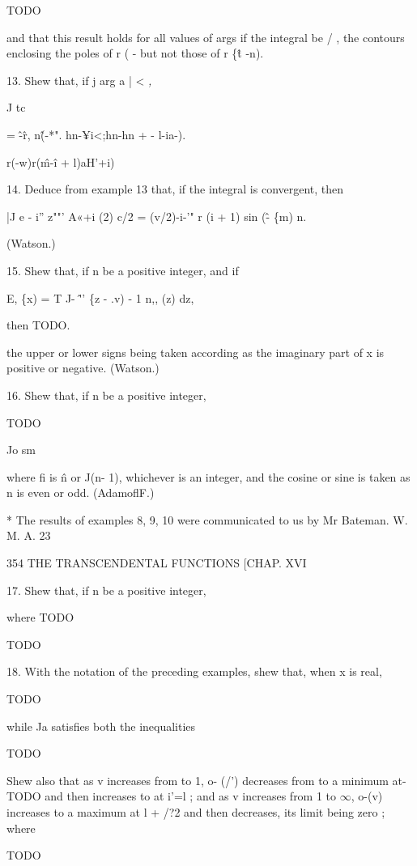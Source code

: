 TODO

and that this result holds for all values of args if the integral be / , the contours 
enclosing the poles of r ( - but not those of r \{\^t -n). 

13. Shew that, if j arg a | < \it, 

J tc 

= \^-\^ r, n\^(-*". hn-¥i<;hn-hn + - l-ia-). 

r(-w)r(\^m-\^i + l)aH'+i) 

14. Deduce from example 13 that, if the integral is convergent, then 

|J e - i'' z""' A«+i (2) c/2 = (v/2)-i-'" r (i + 1) sin (\^ - \{m) n. 

(Watson.) 

15. Shew that, if n be a positive integer, and if 

E, \{x) = T J- \^'' \{z - .v) - 1 n,, (z) dz, 

then TODO.

the upper or lower signs being taken according as the imaginary part of x is positive 
or negative. (Watson.) 

16. Shew that, if n be a positive integer, 

TODO

Jo sm 

where fi is \^n or J(n- 1), whichever is an integer, and the cosine or sine is taken as n is 
even or odd. (AdamoflF.) 

* The results of examples 8, 9, 10 were communicated to us by Mr Bateman. 
W. M. A. 23 



354 THE TRANSCENDENTAL FUNCTIONS [CHAP. XVI 

17. Shew that, if n be a positive integer, 

where TODO

TODO

18. With the notation of the preceding examples, shew that, when x is real, 

TODO

while Ja satisfies both the inequalities 

TODO

Shew also that as v increases from to 1, o- (/') decreases from to a minimum at- 
TODO and then increases to at i'=l ; and as v increases from 1 to $\infty$, o-(v) increases 
to a maximum at l + /?2 and then decreases, its limit being zero ; where 

TODO

